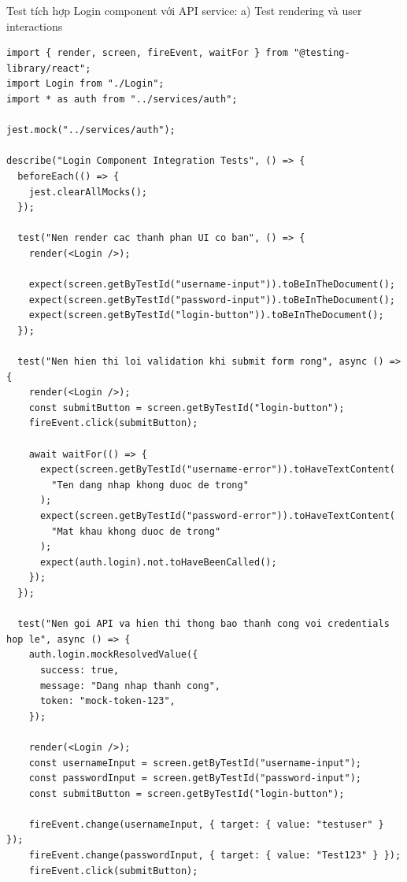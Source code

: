 \documentclass[a4paper,12pt]{article}
\begin{document}
Test tích hợp Login component với API service:
a) Test rendering và user interactions
\begin{tcolorbox}[breakable, colback=green!5,colframe=black!50,title=Login Component Integration Tests]
\begin{lstlisting}
import { render, screen, fireEvent, waitFor } from "@testing-library/react";
import Login from "./Login";
import * as auth from "../services/auth";

jest.mock("../services/auth");

describe("Login Component Integration Tests", () => {
  beforeEach(() => {
    jest.clearAllMocks();
  });

  test("Nen render cac thanh phan UI co ban", () => {
    render(<Login />);

    expect(screen.getByTestId("username-input")).toBeInTheDocument();
    expect(screen.getByTestId("password-input")).toBeInTheDocument();
    expect(screen.getByTestId("login-button")).toBeInTheDocument();
  });

  test("Nen hien thi loi validation khi submit form rong", async () => {
    render(<Login />);
    const submitButton = screen.getByTestId("login-button");
    fireEvent.click(submitButton);

    await waitFor(() => {
      expect(screen.getByTestId("username-error")).toHaveTextContent(
        "Ten dang nhap khong duoc de trong"
      );
      expect(screen.getByTestId("password-error")).toHaveTextContent(
        "Mat khau khong duoc de trong"
      );
      expect(auth.login).not.toHaveBeenCalled();
    });
  });

  test("Nen goi API va hien thi thong bao thanh cong voi credentials hop le", async () => {
    auth.login.mockResolvedValue({
      success: true,
      message: "Dang nhap thanh cong",
      token: "mock-token-123",
    });

    render(<Login />);
    const usernameInput = screen.getByTestId("username-input");
    const passwordInput = screen.getByTestId("password-input");
    const submitButton = screen.getByTestId("login-button");

    fireEvent.change(usernameInput, { target: { value: "testuser" } });
    fireEvent.change(passwordInput, { target: { value: "Test123" } });
    fireEvent.click(submitButton);


\end{lstlisting}
\end{tcolorbox}
\end{document}
